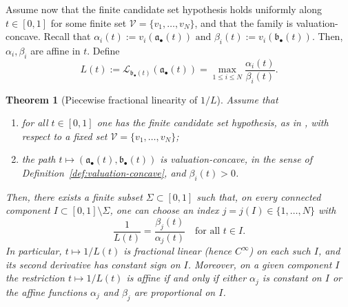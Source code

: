 \documentclass[12pt]{amsart}
\renewcommand{\a}{\mathfrak{a}}
\renewcommand{\b}{\mathfrak{b}}
\newcommand{\Loj}{\mathcal{L}} %
\newcommand{\abul}{{\a_\bullet}}
\newcommand{\bbul}{{\b_\bullet}}
\theoremstyle{plain}
\newtheorem{theorem}{Theorem}[section]
\theoremstyle{definition}
\numberwithin{equation}{section}
\begin{document}
Assume now that the finite candidate set hypothesis holds uniformly along $t\in[0,1]$ for
some finite set $\mathcal V=\{v_1,\dots,v_N\}$, and that the family is valuation-concave.
Recall that $\alpha_i(t):=v_i(\abul(t)) \text{ and } \beta_i(t):=v_i(\bbul(t)).$
Then, $\alpha_i,\beta_i$ are affine in $t$.
Define
\[
L(t):=\Loj_{\bbul(t)}(\abul(t))=\max_{1\le i\le N}\frac{\alpha_i(t)}{\beta_i(t)}.
\]


\begin{theorem}[Piecewise fractional linearity of $1/L$]\label{thm:concavity}
	Assume that 
	\begin{enumerate} 
		\item for all $t\in[0,1]$ one has the finite candidate set hypothesis, as in ,
	with respect to a fixed set $\mathcal V=\{v_1,\dots,v_N\}$;
	\item the path $t\mapsto (\abul(t),\bbul(t))$ is valuation-concave, in the sense of Definition~\ref{def:valuation-concave}, and $\beta_i(t)>0$.
	\end{enumerate}
	Then, there exists a finite subset $\Sigma\subset[0,1]$ such that, on every connected component
	$I\subset[0,1]\setminus\Sigma$, one can choose an index $j=j(I)\in\{1,\dots,N\}$ with
	\[
	\frac{1}{L(t)}=\frac{\beta_j(t)}{\alpha_j(t)}\quad\text{for all }t\in I.
	\]
	In particular, $t\mapsto 1/L(t)$ is fractional linear (hence $C^\infty$) on each such $I$, and its second
	derivative has constant sign on $I$. Moreover, on a given component $I$ the restriction $t\mapsto 1/L(t)$
	is affine if and only if either $\alpha_j$ is constant on $I$ or the affine functions $\alpha_j$ and $\beta_j$ are proportional on $I$.
\end{theorem}
\end{document}
